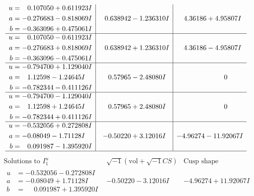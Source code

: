 \documentclass[1p]{elsarticle_modified}
\theoremstyle{definition}
\newcommand{\I}{\sqrt{-1}}
\begin{document}
$$\begin{array}{c|c|c}
\begin{aligned}
u &= \phantom{-}0.107050 + 0.611923 I \\
a &= -0.276683 - 0.818069 I \\
b &= -0.363096 + 0.475061 I\end{aligned}
 & \phantom{-}0.638942 - 1.236310 I & \phantom{-}4.36186 + 4.95807 I \\ \hline\begin{aligned}
u &= \phantom{-}0.107050 - 0.611923 I \\
a &= -0.276683 + 0.818069 I \\
b &= -0.363096 - 0.475061 I\end{aligned}
 & \phantom{-}0.638942 + 1.236310 I & \phantom{-}4.36186 - 4.95807 I \\ \hline\begin{aligned}
u &= -0.794700 + 1.129040 I \\
a &= \phantom{-}1.12598 - 1.24645 I \\
b &= -0.782344 - 0.411126 I\end{aligned}
 & \phantom{-}0.57965 - 2.48080 I & \phantom{-0.000000 } 0 \\ \hline\begin{aligned}
u &= -0.794700 - 1.129040 I \\
a &= \phantom{-}1.12598 + 1.24645 I \\
b &= -0.782344 + 0.411126 I\end{aligned}
 & \phantom{-}0.57965 + 2.48080 I & \phantom{-0.000000 } 0 \\ \hline\begin{aligned}
u &= -0.532056 + 0.272808 I \\
a &= -0.08049 - 1.71128 I \\
b &= \phantom{-}0.091987 - 1.395920 I\end{aligned}
 & -0.50220 + 3.12016 I & -4.96274 - 11.92067 I\\
 \hline 
 \end{array}$$\newpage$$\begin{array}{c|c|c}  
\text{Solutions to }I^u_{1}& \I (\text{vol} + \sqrt{-1}CS) & \text{Cusp shape}\\
 \hline 
\begin{aligned}
u &= -0.532056 - 0.272808 I \\
a &= -0.08049 + 1.71128 I \\
b &= \phantom{-}0.091987 + 1.395920 I\end{aligned}
 & -0.50220 - 3.12016 I & -4.96274 + 11.92067 I \\ \hline\begin{aligned}

\end{aligned}
\end{array}$$
\end{document}
